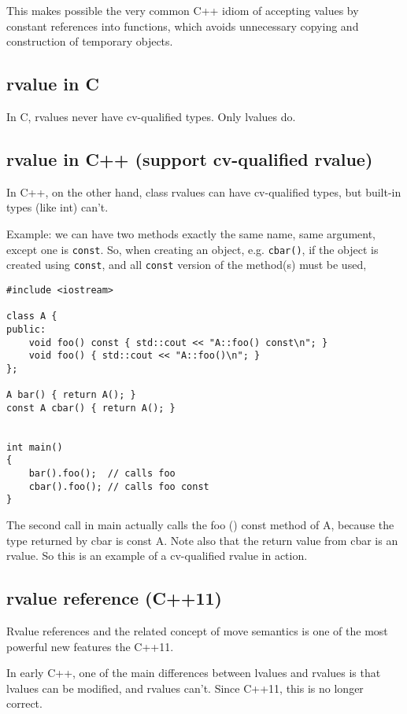 This makes possible the very common C++ idiom of accepting values by constant
references into functions, which avoids unnecessary copying and construction of
temporary objects.

\subsection{rvalue in C}

In C, rvalues never have cv-qualified types. Only lvalues do. 


\subsection{rvalue in C++ (support cv-qualified rvalue)}

In C++, on the other hand, class rvalues can have cv-qualified types, but
built-in types (like int) can't.


Example: we can have two methods exactly the same name, same argument, except one is \verb!const!. So, when creating an object, 
e.g. \verb!cbar()!,
if the object is created using \verb!const!, and all \verb!const! version of the method(s) must be used,
\begin{verbatim}
#include <iostream>

class A {
public:
    void foo() const { std::cout << "A::foo() const\n"; }
    void foo() { std::cout << "A::foo()\n"; }
};

A bar() { return A(); }
const A cbar() { return A(); }


int main()
{
    bar().foo();  // calls foo
    cbar().foo(); // calls foo const
}
\end{verbatim}

The second call in main actually calls the foo () const method of A, because the
type returned by cbar is const A.  Note also that the return value from cbar is
an rvalue. So this is an example of a cv-qualified rvalue in action.

 

\subsection{rvalue reference (C++11)}
\label{sec:rvalue-reference-C++11}


Rvalue references and the related concept of move semantics is one of the most powerful new features the C++11.

In early C++, one of the main differences between lvalues and rvalues is that lvalues can be modified, and rvalues can't. 
Since C++11, this is no longer correct.

